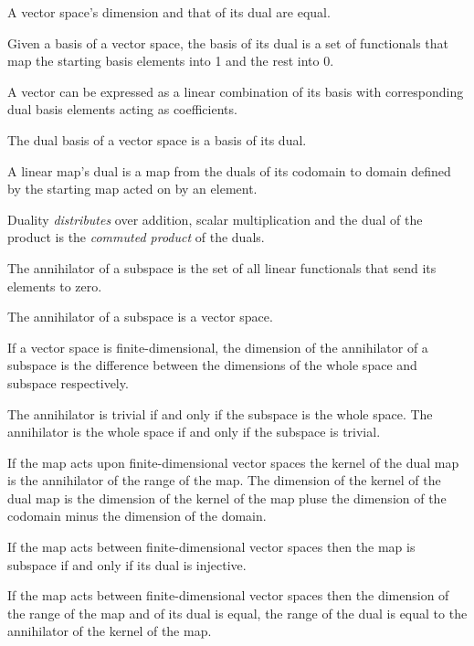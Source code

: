 \begin{multicols}{3}
  A vector space's dimension and that of its dual are equal.

  Given a basis of a vector space, the basis of its dual
  is a set of functionals that map the starting basis elements
  into 1 and the rest into 0.

  A vector can be expressed as a linear combination of its
  basis with corresponding dual basis elements acting as
  coefficients.

  The dual basis of a vector space is a basis of its dual.

  A linear map's dual is a map from the duals of its codomain
  to domain defined by the starting map acted on by an element.

  Duality \textit{distributes} over addition, scalar multiplication
  and the dual of the product is the \textit{commuted product} of the duals.

  The annihilator of a subspace is the set of all linear functionals that send its elements to zero.

  The annihilator of a subspace is a vector space.

  If a vector space is finite-dimensional, the dimension of the annihilator of a subspace is the difference
  between the dimensions of the whole space and subspace respectively.

  The annihilator is trivial if and only if the subspace is the whole space.
  The annihilator is the whole space if and only if the subspace is trivial.

  If the map acts upon finite-dimensional vector spaces
  the kernel of the dual map is the annihilator of the range of the map.
  The dimension of the kernel of the dual map is the dimension of the kernel
  of the map pluse the dimension of the codomain minus the dimension of the domain.
  
  If the map acts between finite-dimensional vector spaces then the map is subspace if and only if its dual is injective.

  If the map acts between finite-dimensional vector spaces then the dimension of the range of the map and of its dual is equal,
  the range of the dual is equal to the annihilator of the kernel of the map.


\end{multicols}
